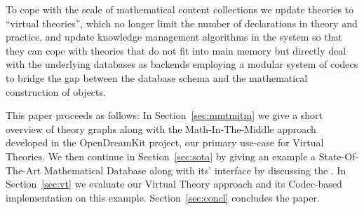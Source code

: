 To cope with the scale of mathematical content collections we update \ommt theories to ``virtual theories'', which no longer limit the number of declarations in theory and practice, and update knowledge management algorithms in the \mmt system so that they can cope with theories that do not fit into main memory but directly deal with the underlying databases as backends employing a modular system of codecs to bridge the gap between the database schema and the mathematical construction of objects.

This paper proceeds as follows: In Section~\ref{sec:mmtmitm} we give a short overview of \ommt theory graphs along with the Math-In-The-Middle approach developed in the OpenDreamKit project, our primary use-case for Virtual Theories.  We then continue in Section~\ref{sec:sota} by giving an example a State-Of-The-Art Mathematical Database along with its' interface by discussing the \lmfdb.  In Section~\ref{sec:vt} we evaluate our Virtual Theory approach and its Codec-based implementation on this example. Section~\ref{sec:concl} concludes the paper.


